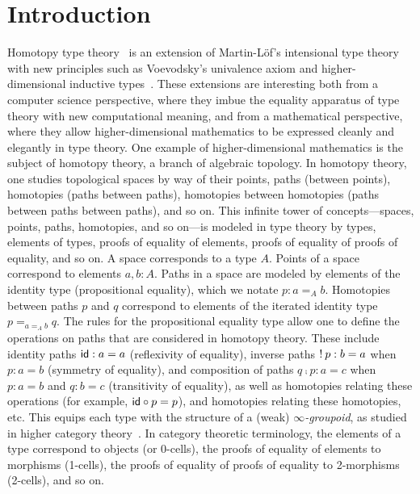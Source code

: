 \newcommand\Z{\ensuremath{\mathbb{Z}}}

\section{Introduction}

Homotopy type theory~\citep{awodeywarren09identity,voevodsky11wollic} is an extension of Martin-L\"of's
intensional type
theory~\citep{nps90mltt,martinlof71itt}
 with new principles such as Voevodsky's
univalence axiom
and higher-dimensional inductive
types~\citep{lumsdaine+13hits}.  These extensions are interesting both from a
computer science perspective, where they imbue the equality apparatus of
type theory with new computational meaning, and from a mathematical
perspective, where they allow higher-dimensional mathematics to be
expressed cleanly and elegantly in type theory.  One example of
higher-dimensional mathematics is the subject of homotopy theory, a
branch of algebraic topology.  In homotopy theory, one studies
topological spaces by way of their points, paths (between points),
homotopies
(paths between paths), homotopies between
homotopies (paths between paths between paths), and so on.  This infinite tower of concepts---spaces,
points, paths, homotopies, and so on---is modeled in type theory by
types, elements of types, proofs of equality of elements, proofs of
equality of proofs of equality, and so on.  A space corresponds to a
type $A$. Points of a space correspond to elements $a,b : A$. Paths in a
space are modeled by elements of the identity type (propositional equality), which we
notate $p : a =_A b$.  Homotopies between paths $p$ and $q$ correspond
to elements of the iterated identity type $p =_{a =_A b} q$.  The
rules for the propositional equality type allow one to define the
operations on paths that are considered in homotopy theory.  These include identity paths
$\mathsf{id} : a = a$ (reflexivity of equality), inverse paths $! \: p : b
= a$ when $p : a = b$ (symmetry of equality), and composition of paths
$q \comp p : a = c$ when $p : a = b$ and $q : b = c$ (transitivity of
equality), as well as homotopies relating these operations (for example,
$\mathsf{id} \mathbin{\circ} p = p$), and homotopies relating these homotopies, etc.  This
equips each type with the structure of a (weak)
\emph{$\infty$-groupoid}, as studied in higher category
theory~\citep{lumsdaine09omega,vandenberggarner10groupoids}.  In category theoretic terminology, the elements of
a type correspond to objects (or 0-cells), the proofs of equality of
elements to morphisms (1-cells), the proofs of equality of proofs of
equality to 2-morphisms (2-cells), and so on.

